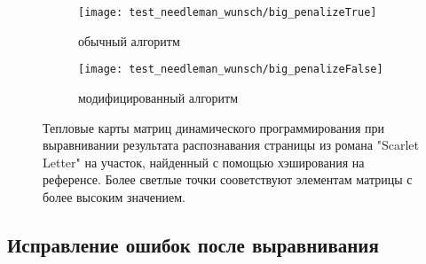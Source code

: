 \documentclass{main.tex}[subfiles]
\begin{document}
\begin{figure}[H]
    \centering
    \begin{subfigure}{.5\textwidth}
        \centering
        \texttt{[image: test\_needleman\_wunsch/big\_penalizeTrue]}
        \caption{обычный алгоритм}
        \label{fig:needleman_real:usual}
    \end{subfigure}%
    \begin{subfigure}{.5\textwidth}
        \centering
        \texttt{[image: test\_needleman\_wunsch/big\_penalizeFalse]}
        \caption{модифицированный алгоритм}
        \label{fig:needleman_real:modified}
    \end{subfigure}
    \caption{Тепловые карты матриц динамического программирования при выравнивании результата распознавания страницы из романа "Scarlet Letter"\hspace{0pt} на участок, найденный с помощью хэширования на референсе.
    Более светлые точки сооветствуют элементам матрицы с более высоким значением.}
    \label{fig:needleman_real} %
\end{figure}

\subsection{Исправление ошибок после выравнивания}
\end{document}

